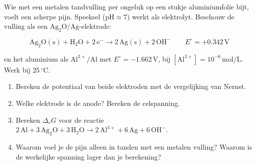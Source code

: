 \begin{oefening}
Wie met een metalen tandvulling per ongeluk op een stukje aluminiumfolie bijt, voelt een scherpe pijn. Speeksel (\(\mathrm{pH} \approx 7\)) werkt als elektrolyt. Beschouw de vulling als een \(\mathrm{Ag_2O/Ag}\)-elektrode:

\[
\mathrm{Ag_2O(s) + H_2O + 2\,e^- \rightarrow 2\,Ag(s) + 2\,OH^-} \qquad E^\circ = +0.342\,\mathrm{V}
\]

en het aluminium als \(\mathrm{Al^{3+}/Al}\) met \(E^\circ = -1.662\,\mathrm{V}\), bij \([\mathrm{Al^{3+}}] = 10^{-6}\,\mathrm{mol/L}\). Werk bij \(25\,^\circ\mathrm{C}\).

\begin{enumerate}
\item[(a)]
  Bereken de potentiaal van beide elektroden met de vergelijking van Nernst.
\item[(b)]
  Welke elektrode is de anode? Bereken de celspanning.
\item[(c)]
  Bereken \(\Delta_r G\) voor de reactie \(\mathrm{2\,Al + 3\,Ag_2O + 3\,H_2O \rightarrow 2\,Al^{3+} + 6\,Ag + 6\,OH^-}\).
\item[(d)]
  Waarom voel je de pijn alleen in tanden met een metalen vulling? Waarom is de werkelijke spanning lager dan je berekening?
\end{enumerate}
\end{oefening}
